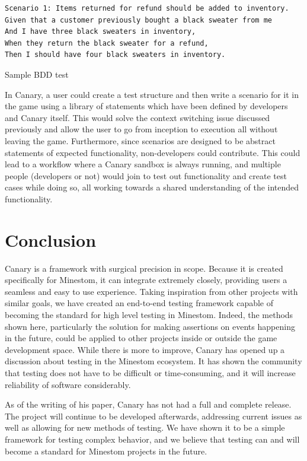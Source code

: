 \documentclass[12pt]{article}
\begin{document}
\begin{onehalfspacing}
\begin{listing}[H]
\begin{verbatim}
Scenario 1: Items returned for refund should be added to inventory.
Given that a customer previously bought a black sweater from me
And I have three black sweaters in inventory,
When they return the black sweater for a refund,
Then I should have four black sweaters in inventory.
\end{verbatim}
\caption{Sample BDD test}
\label{lst:5_2_3_1}
\end{listing}

In Canary, a user could create a test structure and then write a
scenario for it in the game using a library of statements which have
been defined by developers and Canary itself. This would solve the
context switching issue discussed previously and allow the user to go
from inception to execution all without leaving the game. Furthermore,
since scenarios are designed to be abstract statements of expected
functionality, non-developers could contribute. This could lead to a
workflow where a Canary sandbox is always running, and multiple people
(developers or not) would join to test out functionality and create test
cases while doing so, all working towards a shared understanding of the
intended functionality.

\section{Conclusion}

Canary is a framework with surgical precision in scope. Because it is
created specifically for Minestom, it can integrate extremely closely,
providing users a seamless and easy to use experience. Taking
inspiration from other projects with similar goals, we have created an
end-to-end testing framework capable of becoming the standard for high
level testing in Minestom. Indeed, the methods shown here, particularly
the solution for making assertions on events happening in the future,
could be applied to other projects inside or outside the game
development space. While there is more to improve, Canary has opened up
a discussion about testing in the Minestom ecosystem. It has shown the
community that testing does not have to be difficult or time-consuming,
and it will increase reliability of software considerably.

As of the writing of his paper, Canary has not had a full and complete
release. The project will continue to be developed afterwards,
addressing current issues as well as allowing for new methods of
testing. We have shown it to be a simple framework for testing complex
behavior, and we believe that testing can and will become a standard for
Minestom projects in the future.

\end{onehalfspacing} %
\end{document}
